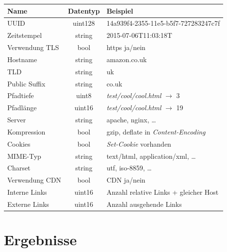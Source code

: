 \documentclass[a4paper,12pt,titlepage=false]{scrreprt}
\begin{document}
\begin{center}
\begin{tabular}{lcl}
    \textbf{Name}  & \textbf{Datentyp} & \textbf{Beispiel} \\ \hline\hline
    UUID           & uint128           & \textcolor{light-gray}{14a939f4-2355-11e5-b5f7-727283247c7f} \\ \hline
    Zeitstempel    & string            & \textcolor{light-gray}{2015-07-06T11:03:18T} \\ \hline
    Verwendung TLS & bool              & https ja/nein \\ \hline
    Hostname       & string            & \textcolor{light-gray}{amazon.co.uk} \\ \hline
    TLD            & string            & \textcolor{light-gray}{uk} \\ \hline
    Public Suffix  & string            & \textcolor{light-gray}{co.uk} \\ \hline
    Pfadtiefe      & uint8             & \textit{test/cool/cool.html} $\rightarrow$ \textcolor{light-gray}{3} \\ \hline
    Pfadlänge      & uint16            & \textit{test/cool/cool.html} $\rightarrow$ \textcolor{light-gray}{19} \\ \hline
    Server         & string            & \textcolor{light-gray}{apache}, \textcolor{light-gray}{nginx}, \dots \\ \hline
    Kompression    & bool              & \textcolor{light-gray}{gzip}, \textcolor{light-gray}{deflate} in \textit{Content-Encoding} \\ \hline
    Cookies        & bool              & \textit{Set-Cookie} vorhanden \\ \hline
    MIME-Typ       & string            & \textcolor{light-gray}{text/html}, \textcolor{light-gray}{application/xml}, \dots\\ \hline
    Charset        & string            & \textcolor{light-gray}{utf}, \textcolor{light-gray}{iso-8859}, \dots \\ \hline
    Verwendung CDN & bool              & CDN ja/nein \\ \hline
    Interne Links  & uint16            & Anzahl relative Links + gleicher Host \\ \hline
    Externe Links  & uint16            & Anzahl ausgehende Links
\end{tabular}
\end{center}



\chapter{Ergebnisse}
\label{Ergebnisse}
\end{document}
